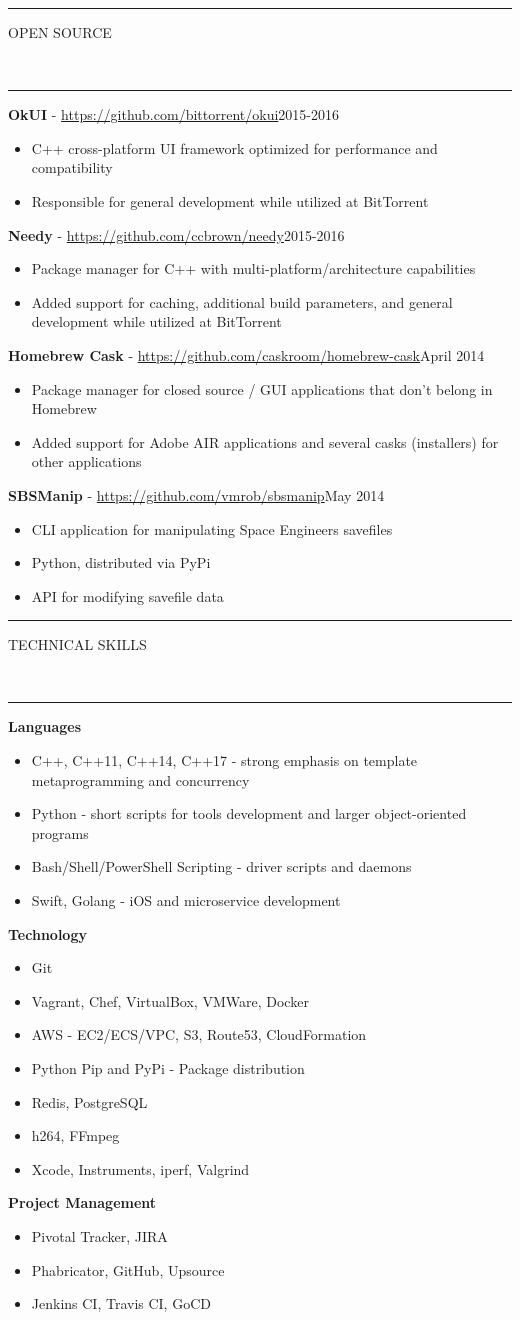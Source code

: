 \documentclass[10pt, letterpaper, oneside]{article}
\newcommand{\HRule}[2]{\textcolor{#1}{\rule{\linewidth}{#2}}}
\newcommand{\sectiontitle}[1]{\begin{minipage}{\textwidth}\HRule{black}{0.25mm}\vspace{-10pt}\begin{center}\Large\MakeUppercase{#1}\end{center}\end{minipage}\\\HRule{light-grey}{0.15mm}\vspace{\baselineskip}}
\newenvironment{ressection}[1]{
  \sectiontitle{#1}}
  {\vspace{0.5\baselineskip}}
\newenvironment{tightressection}[1]{
  \begin{minipage}{\textwidth}
  \sectiontitle{#1}}
  {\vspace{2\baselineskip}\end{minipage}}
\newcommand{\resitem}[1]{
    \vspace{2pt}
    \item \begin{flushleft} #1 \end{flushleft}
}
\newcommand{\resentryheader}[3]{
    \vspace{-5pt}
    \textbf{#1} - #2\hspace{\stretch{1}}\textcolor{light-grey}{#3}\\
}
\newenvironment{resentry}[3]{
  \begin{minipage}{\textwidth}
    \resentryheader{#1}{#2}{#3}
        \vspace{-\baselineskip}
    \begin{itemize}[noitemsep,nolistsep]
}{
    \end{itemize}
        \vspace{\baselineskip}
        \end{minipage}
}
\newcommand{\restechentryheader}[1]{
    \vspace{-5pt}
    \textbf{#1}\\
}
\newenvironment{restechentry}[1]{
  \begin{minipage}{\textwidth}
    \restechentryheader{#1}
        \vspace{-\baselineskip}
    \begin{itemize}[noitemsep,nolistsep]
}{
    \end{itemize}
        \vspace{\baselineskip}
        \end{minipage}
}
\begin{document}
\begin{tightressection}{Open Source}
  \begin{resentry}{OkUI}{\href{https://github.com/bittorrent/okui/commits?author=vmrob}{https://github.com/bittorrent/okui}}{2015-2016}
    \resitem{C++ cross-platform UI framework optimized for performance and compatibility}
    \resitem{Responsible for general development while utilized at BitTorrent}
  \end{resentry}
  \begin{resentry}{Needy}{\href{https://github.com/ccbrown/needy/commits?author=vmrob}{https://github.com/ccbrown/needy}}{2015-2016}
    \resitem{Package manager for C++ with multi-platform/architecture capabilities}
    \resitem{Added support for caching, additional build parameters, and general development while utilized at BitTorrent}
  \end{resentry}
  \begin{resentry}{Homebrew Cask}{\href{https://github.com/caskroom/homebrew-cask/commits?author=vmrob}{https://github.com/caskroom/homebrew-cask}}{April 2014}
    \resitem{Package manager for closed source / GUI applications that don't belong in Homebrew}
    \resitem{Added support for Adobe AIR applications and several casks (installers) for other applications}
  \end{resentry}
  \begin{resentry}{SBSManip}{\href{https://github.com/vmrob/sbsmanip}{https://github.com/vmrob/sbsmanip}}{May 2014}
    \resitem{CLI application for manipulating Space Engineers savefiles}
    \resitem{Python, distributed via PyPi}
    \resitem{API for modifying savefile data}
  \end{resentry}
\end{tightressection}

\begin{ressection}{Technical Skills}
  \begin{restechentry}{Languages}
    \resitem{C++, C++11, C++14, C++17 - strong emphasis on template metaprogramming and concurrency}
    \resitem{Python - short scripts for tools development and larger object-oriented programs}
    \resitem{Bash/Shell/PowerShell Scripting - driver scripts and daemons}
    \resitem{Swift, Golang - iOS and microservice development}
  \end{restechentry}
  \begin{multicols}{2}
    \begin{restechentry}{Technology}
      \resitem{Git}
      \resitem{Vagrant, Chef, VirtualBox, VMWare, Docker}
      \resitem{AWS - EC2/ECS/VPC, S3, Route53, CloudFormation}
      \resitem{Python Pip and PyPi - Package distribution}
      \resitem{Redis, PostgreSQL}
      \resitem{h264, FFmpeg}
      \resitem{Xcode, Instruments, iperf, Valgrind}
    \end{restechentry}
    \begin{restechentry}{Project Management}
      \resitem{Pivotal Tracker, JIRA}
      \resitem{Phabricator, GitHub, Upsource}
      \resitem{Jenkins CI, Travis CI, GoCD}
    \end{restechentry}
  \end{multicols}
\end{ressection}
\end{document}
